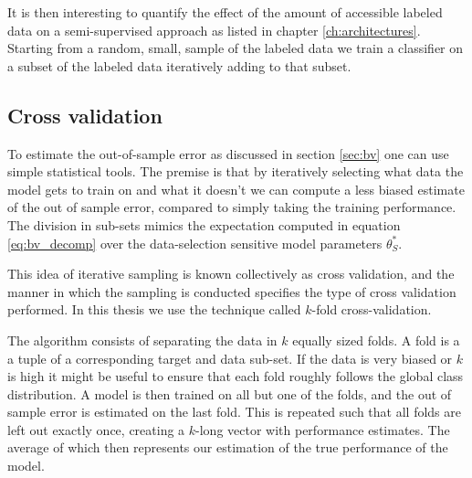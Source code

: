 It is then interesting to quantify the effect of the amount of accessible labeled data on a semi-supervised approach as listed in chapter \ref{ch:architectures}. Starting from a random, small, sample of the labeled data we train a classifier on a subset of the labeled data iteratively adding to that subset. 


\subsection{Cross validation}\label{sec:cv}

To estimate the out-of-sample error as discussed in section \ref{sec:bv} one can use simple statistical tools. The premise is that by iteratively selecting what data the model gets to train on and what it doesn't we can compute a less biased estimate of the out of sample error, compared to simply taking the training performance. The division in sub-sets mimics the expectation computed in equation \ref{eq:bv_decomp} over the data-selection sensitive model parameters $\theta_S^*$. 

This idea of iterative sampling is known collectively as cross validation, and the manner in which the sampling is conducted specifies the type of cross validation performed. In this thesis we use the technique called $k$-fold cross-validation. 

The algorithm consists of separating the data in $k$ equally sized folds. A fold is a a tuple of a corresponding target and data sub-set. If the data is very biased or $k$ is high it might be useful to ensure that each fold roughly follows the global class distribution. A model is then trained on all but one of the folds, and the out of sample error is estimated on the last fold. This is repeated such that all folds are left out exactly once, creating a $k$-long vector with performance estimates. The average of which then represents our estimation of the true performance of the model.